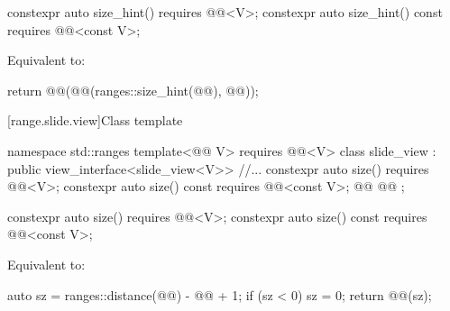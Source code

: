 \documentclass{wg21}
\begin{document}
\begin{addedblock}
\begin{itemdecl}
    constexpr auto size_hint() requires @@<V>;
    constexpr auto size_hint() const requires @@<const V>;
\end{itemdecl}

\begin{itemdescr}
    \pnum
    \effects
    Equivalent to:
    \begin{codeblock}
        return @@(@@(ranges::size_hint(@@), @@));
    \end{codeblock}
\end{itemdescr}
\end{addedblock}

[range.slide.view]{Class template }

%
%
%
\begin{codeblock}
namespace std::ranges {
template<@@ V>
requires @@<V>
class slide_view : public view_interface<slide_view<V>> {
    //...
    constexpr auto size() requires @@<V>;
    constexpr auto size() const requires @@<const V>;
    @@
    @@
};
}
\end{codeblock}

\begin{itemdecl}
    constexpr auto size() requires @@<V>;
    constexpr auto size() const requires @@<const V>;
\end{itemdecl}

\begin{itemdescr}
    \pnum
    \effects
    Equivalent to:
    \begin{codeblock}
        auto sz = ranges::distance(@@) - @@ + 1;
        if (sz < 0) sz = 0;
        return @@(sz);
    \end{codeblock}
\end{itemdescr}
\end{document}
